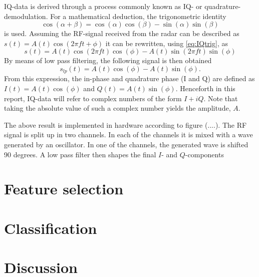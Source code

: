 \documentclass[a4paper, 12pt]{article}
\begin{document}
IQ-data is derived through a process commonly known as IQ- or quadrature-demodulation. For a mathematical deduction, the trigonometric identity
\begin{equation}
	\label{eq:IQtrig}
	\cos(\alpha+\beta) = \cos(\alpha)\cos(\beta)-\sin(\alpha)\sin(\beta)
\end{equation}
is used. Assuming the RF-signal received from the radar can be described as $s(t) = A(t)\cos(2\pi ft+\phi)$ it can be rewritten, using \eqref{eq:IQtrig}, as 
\begin{equation}
	s(t)=A(t)\cos(2\pi ft)\cos(\phi)-A(t)\sin(2\pi ft)\sin(\phi)
\end{equation}
By means of low pass filtering, the following signal is then obtained
\begin{equation}
	s_{lp}(t)=A(t)\cos(\phi)-A(t)\sin(\phi).
\end{equation}
From this expression, the in-phase and quadrature phase (I and Q) are defined as $I(t)=A(t)\cos(\phi)$ and $Q(t)=A(t)\sin(\phi)$. Henceforth in this report, IQ-data will refer to complex numbers of the form $I+i Q$. Note that taking the absolute value of such a complex number yields the amplitude, $A$.

The above result is implemented in hardware according to figure (....). The RF signal is split up in two channels. In each of the channels it is mixed with a wave generated by an oscillator. In one of the channels, the generated wave is shifted 90 degrees. A low pass filter then shapes the final $I$- and $Q$-components



\section{Feature selection}

\section{Classification}

\section{Discussion}
\end{document}
